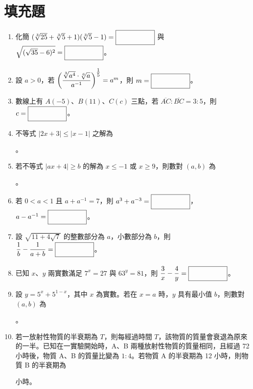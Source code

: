 \documentclass[12pt]{article}
\newcommand*{\blank}[1]{\rule[-.7\baselineskip]{0pt}{1.8\baselineskip}\fbox{\rule[-.4\baselineskip]{0pt}{1.2\baselineskip}\hspace{#1}}}
\newcommand*{\fraction}[2]{\rule[-.8\baselineskip]{0pt}{2\baselineskip}\dfrac{#1}{#2}}
\newcommand*{\sfraction}[2]{\rule[-.4\baselineskip]{0pt}{1.2\baselineskip}\tfrac{#1}{#2}}
\begin{document}
\section{填充題}
\begin{enumerate}[label=\Alph*.,align=left,leftmargin=*,labelsep=.3em]
  \item 化簡 $(\sqrt[3]{25}+\sqrt[3]{5}+1)(\sqrt[3]{5}-1) = \blank{5em}$ 與 $\sqrt{(\sqrt{35}-6)^2} = \blank{5em}$。
  \newpage
  \item 設 $a > 0$，若 $\biggl(\fraction{\sqrt[3]{a^4} \cdot \sqrt[6]{a}}{a^{-1}}\biggr)^{\sfraction{1}{5}} = a^m$，則 $m = \blank{5em}$。
  \newpage
  \item 數線上有 $A(-5)$、$B(11)$、$C(c)$ 三點，若 $\overline{AC}:\overline{BC} = 3:5$，則 $c = \blank{5em}$。
  \newpage
  \item 不等式 $\lvert 2x + 3 \rvert \leq \lvert x - 1 \rvert$ 之解為 \blank{8em}。
  \newpage
  \item 若不等式 $\lvert ax + 4 \rvert \geq b$ 的解為 $x \leq -1$ 或 $x \geq 9$，則數對 $(a, b)$ 為 \blank{5em}。
  \newpage
  \item 若 $0 < a < 1$ 且 $a + a^{-1} = 7$，則 $a^3 + a^{-3} = \blank{5em}$，$a - a^{-1} = \blank{5em}$。
  \newpage
  \item 設 $\sqrt{11+4\sqrt{7}}$ 的整數部分為 $a$，小數部分為 $b$，則 $\fraction{1}{b} - \fraction{1}{a+b} = \blank{5em}$。
  \newpage
  \item 已知 $x$、$y$ 兩實數滿足 $7^x = 27$ 與 $63^y = 81$，則 $\fraction{3}{x} - \fraction{4}{y} = \blank{5em}$。
  \newpage
  \item 設 $y = 5^x + 5^{1-x}$，其中 $x$ 為實數。若在 $x = a$ 時，$y$ 具有最小值 $b$，則數對 $(a, b)$ 為 \blank{5em}。
  \newpage
  \item 若一放射性物質的半衰期為 $T$，則每經過時間 $T$，該物質的質量會衰退為原來的一半。已知在一實驗開始時，A、B 兩種放射性物質的質量相同，且經過 72 小時後，物質 A、B 的質量比變為 $1:4$。若物質 A 的半衰期為 12 小時，則物質 B 的半衰期為 \blank{5em} 小時。
\end{enumerate}

\newpage
\end{document}
